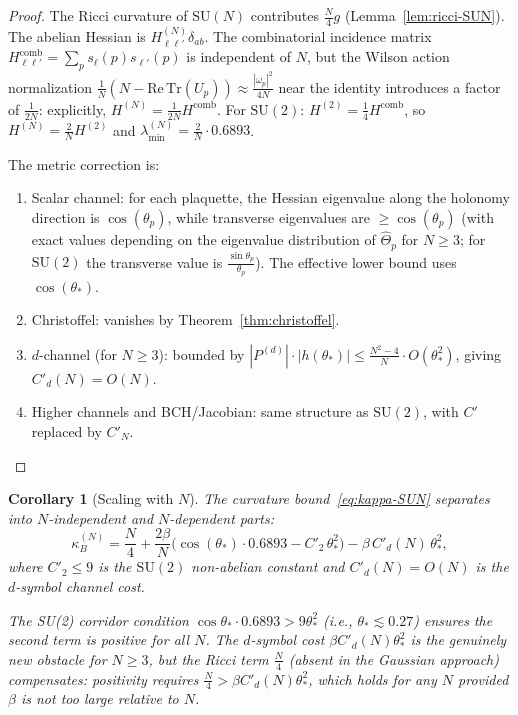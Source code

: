 \documentclass[11pt,a4paper]{article}
\theoremstyle{plain}
\newtheorem{corollary}[theorem]{Corollary}
\theoremstyle{definition}
\theoremstyle{remark}
\newcommand{\SU}{\mathrm{SU}}
\newcommand{\Tr}{\mathrm{Tr}}
\begin{document}
\begin{proof}
The Ricci curvature of $\SU(N)$ contributes $\frac{N}{4}g$
(Lemma~\ref{lem:ricci-SUN}). The abelian Hessian is
$H^{(N)}_{\ell\ell'}\delta_{ab}$. The combinatorial incidence
matrix $H^{\mathrm{comb}}_{\ell\ell'} = \sum_p s_\ell(p)s_{\ell'}(p)$
is independent of $N$, but the Wilson action normalization
$\frac{1}{N}(N - \mathrm{Re}\,\Tr(U_p)) \approx
\frac{|\omega_p|^2}{4N}$ near the identity introduces a factor
of $\frac{1}{2N}$: explicitly, $H^{(N)} = \frac{1}{2N}H^{\mathrm{comb}}$.
For $\SU(2)$: $H^{(2)} = \frac{1}{4}H^{\mathrm{comb}}$,
so $H^{(N)} = \frac{2}{N}H^{(2)}$ and
$\lambda_{\min}^{(N)} = \frac{2}{N}\cdot 0.6893$.

The metric correction is:
\begin{enumerate}[label=(\roman*)]
\item Scalar channel: for each plaquette, the Hessian eigenvalue
  along the holonomy direction is $\cos(\theta_p)$, while
  transverse eigenvalues are $\geq \cos(\theta_p)$ (with exact
  values depending on the eigenvalue distribution of
  $\hat\Theta_p$ for $N \geq 3$; for $\SU(2)$ the transverse
  value is $\frac{\sin\theta_p}{\theta_p}$). The effective lower
  bound uses $\cos(\theta_*)$.
\item Christoffel: vanishes by Theorem~\ref{thm:christoffel}.
\item $d$-channel (for $N \geq 3$): bounded by
  $|P^{(d)}|\cdot|h(\theta_*)| \leq \frac{N^2-4}{N}\cdot
  O(\theta_*^2)$, giving $C'_d(N) = O(N)$.
\item Higher channels and BCH/Jacobian: same structure as
  $\SU(2)$, with $C'$ replaced by $C'_N$.
\end{enumerate}
\end{proof}

\begin{corollary}[Scaling with $N$]
The curvature bound~\eqref{eq:kappa-SUN} separates into
$N$-independent and $N$-dependent parts:
\begin{equation}
\kappa_B^{(N)} = \frac{N}{4}
+ \frac{2\beta}{N}\bigl(\cos(\theta_*)\cdot 0.6893
  - C'_2\,\theta_*^2\bigr)
- \beta\,C'_d(N)\,\theta_*^2,
\end{equation}
where $C'_2 \leq 9$ is the $\SU(2)$ non-abelian constant and
$C'_d(N) = O(N)$ is the $d$-symbol channel cost.

The SU(2) corridor condition $\cos\theta_*\cdot 0.6893 > 9\theta_*^2$
(i.e., $\theta_* \lesssim 0.27$) ensures the second term is
positive for \emph{all} $N$. The $d$-symbol cost
$\beta C'_d(N)\theta_*^2$ is the genuinely new obstacle for
$N \geq 3$, but the Ricci term $\frac{N}{4}$ (absent in the
Gaussian approach) compensates: positivity requires
$\frac{N}{4} > \beta C'_d(N)\theta_*^2$, which holds for
any $N$ provided $\beta$ is not too large relative to $N$.
\end{corollary}
\end{document}

